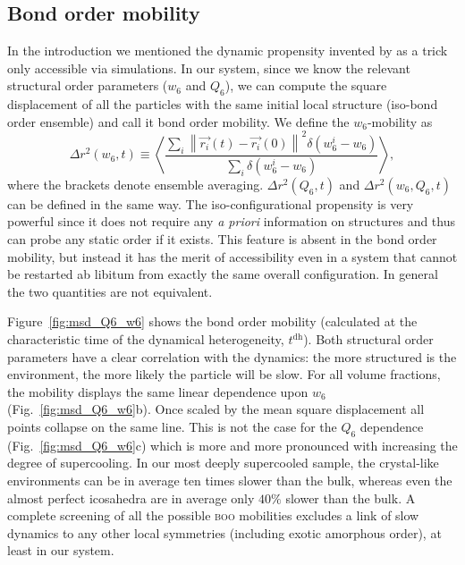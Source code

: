 \subsection*{Bond order mobility}
In the introduction we mentioned the dynamic propensity invented by \citet{Widmer-Cooper2005} as a trick only accessible via simulations. In our system, since we know the relevant structural order parameters ($w_6$ and $Q_6$), we can compute the square displacement of all the particles with the same initial local structure (iso-bond order ensemble) and call it bond order mobility. We define the $w_6$-mobility as
\begin{equation}
	\Delta r^2(w_6, t) \equiv \left\langle \frac{
		\sum\limits_i{
			\left\|\vec{r_i}(t)-\vec{r_i}(0)\right\|^2 \delta(w_6^i-w_6)
			}
	}{
		\sum\limits_i{\delta(w_6^i-w_6)}
	}\right\rangle, 
	\label{eq:bo_propensity}
\end{equation}
where the brackets denote ensemble averaging. $\Delta r^2(Q_6, t)$ and $\Delta r^2(w_6, Q_6, t)$ can be defined in the same way. 
The iso-configurational propensity is very powerful since it does not require any {\it a priori} information on structures and thus can probe any static order if it exists. This feature is absent in the bond order mobility, but instead it has the merit of accessibility even in a system that cannot be restarted ab libitum from exactly the same overall configuration. In general the two quantities are not equivalent.

Figure~\ref{fig:msd_Q6_w6} shows the bond order mobility (calculated at the characteristic time of the dynamical heterogeneity, $t^\text{dh}$). Both structural order parameters have a clear correlation with the dynamics: the more structured is the environment, the more likely the particle will be slow. For all volume fractions, the mobility displays the same linear dependence upon $w_6$ (Fig.~\ref{fig:msd_Q6_w6}b). Once scaled by the mean square displacement all points collapse on the same line. This is not the case for the $Q_6$ dependence (Fig.~\ref{fig:msd_Q6_w6}c) which is more and more pronounced with increasing the degree of supercooling. In our most deeply supercooled sample, the crystal-like environments can be in average ten times slower than the bulk, whereas even the almost perfect icosahedra are in average only $40\%$ slower than the bulk. A complete screening of all the possible \textsc{boo} mobilities excludes a link of slow dynamics to any other local symmetries (including exotic amorphous order), at least in our system.

